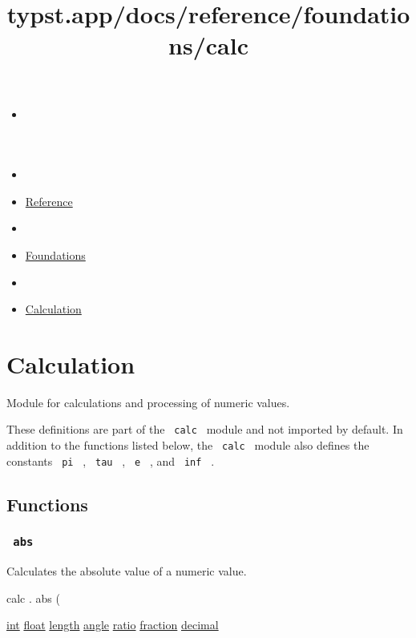 \title{typst.app/docs/reference/foundations/calc}

\begin{itemize}
\tightlist
\item
  \href{/docs}{}
\item
  
\item
  \href{/docs/reference/}{Reference}
\item
  
\item
  \href{/docs/reference/foundations/}{Foundations}
\item
  
\item
  \href{/docs/reference/foundations/calc}{Calculation}
\end{itemize}

\section{Calculation}\label{summary}

Module for calculations and processing of numeric values.

These definitions are part of the \texttt{\ calc\ } module and not
imported by default. In addition to the functions listed below, the
\texttt{\ calc\ } module also defines the constants \texttt{\ pi\ } ,
\texttt{\ tau\ } , \texttt{\ e\ } , and \texttt{\ inf\ } .

\subsection{Functions}\label{functions}

\subsubsection{\texorpdfstring{\texttt{\ abs\ }}{ abs }}\label{functions-abs}

Calculates the absolute value of a numeric value.

calc { . } { abs } (

{ \href{/docs/reference/foundations/int/}{int}
\href{/docs/reference/foundations/float/}{float}
\href{/docs/reference/layout/length/}{length}
\href{/docs/reference/layout/angle/}{angle}
\href{/docs/reference/layout/ratio/}{ratio}
\href{/docs/reference/layout/fraction/}{fraction}
\href{/docs/reference/foundations/decimal/}{decimal} }

